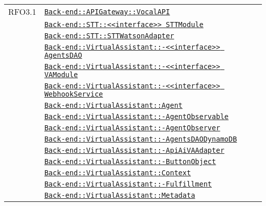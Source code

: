 \begin{longtable}{|>{\centering}m{3cm}|m{10cm}<{\centering}|}
RFO3.1 & \hyperref[Back-end::APIGateway::VocalAPI]{\texttt{Back-end::APIGateway::VocalAPI}}\\
& \hyperref[Back-end::STT::<<interface>> STTModule]{\texttt{Back-end::STT::<<interface>> STTModule}}\\
& \hyperref[Back-end::STT::STTWatsonAdapter]{\texttt{Back-end::STT::STTWatsonAdapter}}\\
& \hyperref[Back-end::VirtualAssistant::<<interface>> AgentsDAO]{\texttt{Back-end::VirtualAssistant::-\linebreak <<interface>> AgentsDAO}}\\
& \hyperref[Back-end::VirtualAssistant::<<interface>> VAModule]{\texttt{Back-end::VirtualAssistant::-\linebreak <<interface>> VAModule}}\\
& \hyperref[Back-end::VirtualAssistant::<<interface>> WebhookService]{\texttt{Back-end::VirtualAssistant::-\linebreak <<interface>> WebhookService}}\\
& \hyperref[Back-end::VirtualAssistant::Agent]{\texttt{Back-end::VirtualAssistant::Agent}}\\
& \hyperref[Back-end::VirtualAssistant::AgentObservable]{\texttt{Back-end::VirtualAssistant::-\linebreak AgentObservable}}\\
& \hyperref[Back-end::VirtualAssistant::AgentObserver]{\texttt{Back-end::VirtualAssistant::-\linebreak AgentObserver}}\\
& \hyperref[Back-end::VirtualAssistant::AgentsDAODynamoDB]{\texttt{Back-end::VirtualAssistant::-\linebreak AgentsDAODynamoDB}}\\
& \hyperref[Back-end::VirtualAssistant::ApiAiVAAdapter]{\texttt{Back-end::VirtualAssistant::-\linebreak ApiAiVAAdapter}}\\
& \hyperref[Back-end::VirtualAssistant::ButtonObject]{\texttt{Back-end::VirtualAssistant::-\linebreak ButtonObject}}\\
& \hyperref[Back-end::VirtualAssistant::Context]{\texttt{Back-end::VirtualAssistant::Context}}\\
& \hyperref[Back-end::VirtualAssistant::Fulfillment]{\texttt{Back-end::VirtualAssistant::-\linebreak Fulfillment}}\\
& \hyperref[Back-end::VirtualAssistant::Metadata]{\texttt{Back-end::VirtualAssistant::Metadata}}\\

\end{longtable}
